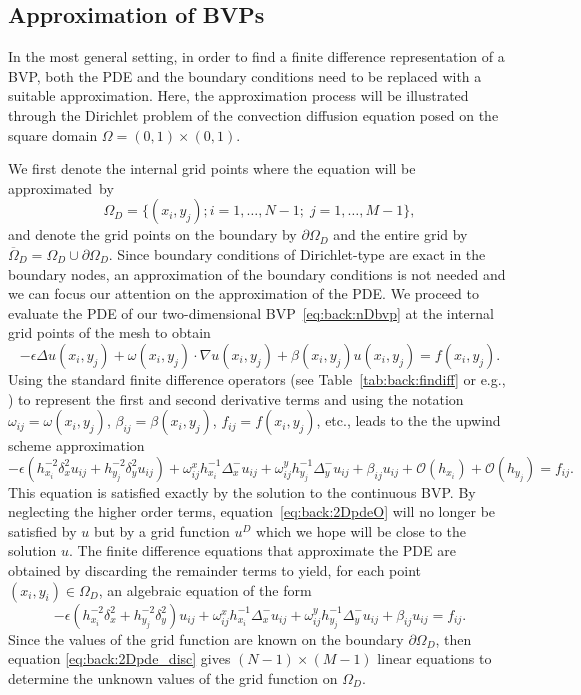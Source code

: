 \subsection{Approximation of BVPs}
\label{back:convdiff:BVPapprox}
In the most general setting, in order to find a finite difference
representation of a BVP, both the PDE and the boundary conditions need to be
replaced with a suitable approximation. Here, the approximation process will be
illustrated through the Dirichlet problem of the convection diffusion
equation posed on the square domain $\Omega=(0,1)\times(0,1)$.

We first denote the internal grid points where the equation will be
approximated~by
\[
\Omega_D=\{(x_i,y_j);i=1,\ldots,N-1;\;j=1,\ldots,M-1\},
\]
and denote the grid points on the boundary by $\partial\Omega_D$ and the
entire grid by $\overline{\Omega}_D=\Omega_D\cup\partial\Omega_D$.
Since boundary conditions of Dirichlet-type are exact in the
boundary nodes, an approximation of the boundary conditions is not needed and
we can focus our attention on the approximation of the PDE. We proceed to
evaluate the PDE of our two-dimensional BVP~\eqref{eq:back:nDbvp} at the
internal grid points of the mesh to obtain
%
\begin{equation}\label{eq:back:2Dpde}
-\epsilon \Delta u(x_i,y_j) + \omega(x_i,y_j)\cdot \nabla u(x_i,y_j) + \beta(x_i,y_j) u(x_i,y_j) = f(x_i,y_j).
\end{equation}
%
Using the standard finite difference operators
(see Table~\ref{tab:back:findiff} or e.g., \cite[\S~4]{Sty05})
to represent the first and second derivative terms and using the notation
$\omega_{ij}=\omega(x_i,y_j)$, $\beta_{ij}=\beta(x_i,y_j)$, $f_{ij}=f(x_i,y_j)$, etc., leads to the the upwind scheme approximation
%
\begin{equation}\label{eq:back:2DpdeO}
-\epsilon \left( h_{x_{i}}^{-2}\delta^2_x u_{ij} + h_{y_{j}}^{-2}\delta^2_y u_{ij}\right) + \omega^x_{ij} h_{x_{i}}^{-1}\Delta^{-}_{x}u_{ij} + \omega^y_{ij} h_{y_{j}}^{-1}\Delta^{-}_{y}u_{ij} + \beta_{ij} u_{ij} + \mathscr{O}(h_{x_{i}}) + \mathscr{O}(h_{y_{j}}) = f_{ij}.
\end{equation}
%
This equation is satisfied exactly by the solution to the continuous BVP.
By neglecting the higher order terms, equation~\eqref{eq:back:2DpdeO} will no
longer be satisfied by $u$ but by a grid function $u^D$ which we hope will be
close to the solution $u$. The finite difference equations that approximate
the PDE are obtained by discarding the remainder terms to yield, for each
point $(x_i,y_i)\in\Omega_D$, an algebraic equation of the form
\begin{equation}\label{eq:back:2Dpde_disc}
-\epsilon \left( h_{x_{i}}^{-2}\delta^2_x + h_{y_{j}}^{-2}\delta^2_y \right)u_{ij} + \omega^x_{ij} h_{x_{i}}^{-1}\Delta^{-}_{x}u_{ij} + \omega^y_{ij} h_{y_{j}}^{-1}\Delta^{-}_{y}u_{ij} + \beta_{ij} u_{ij}  = f_{ij}.
\end{equation}
Since the values of the grid function are known on the boundary
$\partial\Omega_D$, then equation \eqref{eq:back:2Dpde_disc} gives
$(N-1)\times(M-1)$ linear equations to determine the unknown values of the
grid function on $\Omega_D$.

